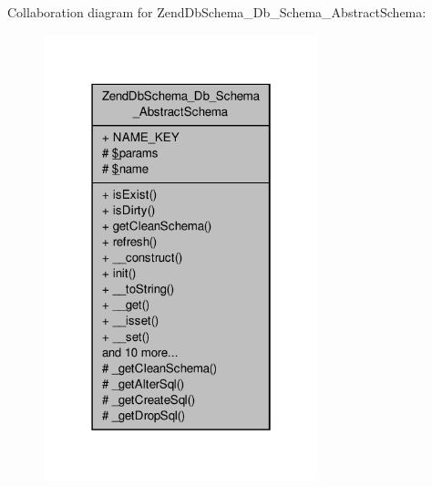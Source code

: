 Collaboration diagram for Zend\-Db\-Schema\-\_\-\-Db\-\_\-\-Schema\-\_\-\-Abstract\-Schema\-:\nopagebreak
\begin{figure}[H]
\begin{center}
\leavevmode
\includegraphics[width=226pt]{classZendDbSchema__Db__Schema__AbstractSchema__coll__graph}
\end{center}
\end{figure}
